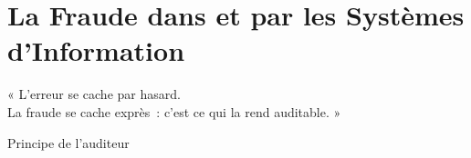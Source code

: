 
\chapter{La Fraude dans et par les Systèmes d'Information}
\label{chap:fraude}

\epigraph{%
    « L'erreur se cache par hasard.\\
    La fraude se cache exprès~: c'est ce qui la rend auditable. »%
}{Principe de l'auditeur}


